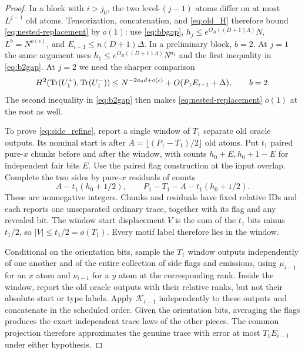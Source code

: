 \begin{proof}
In a block with $i>j_0$, the two level-$(j-1)$ atoms differ on at most $L^{j-1}$ old atoms.  Tensorization, concatenation, and \eqref{eq:old_H} therefore bound \eqref{eq:nested-replacement} by $o(1)$: use \eqref{eq:bbgap}, $h_j\le e^{O_B((D+1)\Lambda)}N$, $L^b=N^{o(\epsilon)}$, and $E_{i-1}\le n(D+1)\Delta$.  In a preliminary block, $b=2$.  At $j=1$ the same argument uses $h_1\le e^{O_B((D+1)\Lambda)}N^{a_1}$ and the first inequality in \eqref{eq:b2gap}.  At $j=2$ we need the sharper comparison
\begin{equation}\label{eq:side_refine}
 H^2(\mathrm{Tr}(U_1^+),\mathrm{Tr}(U_1^-))
 \le N^{-2a_0d+o(\epsilon)}+O(P_1E_{i-1}+\Delta),\qquad b=2.
\end{equation}
The second inequality in \eqref{eq:b2gap} then makes \eqref{eq:nested-replacement} $o(1)$ at the root as well.

To prove \eqref{eq:side_refine}, report a single window of $T_1$ separate old oracle outputs.  Its nominal start is after
$A=\lfloor(P_1-T_1)/2\rfloor$ old atoms.  Put $t_1$ paired pure-$x$ chunks before and after the window, with counts $h_0+E,h_0+1-E$ for independent fair bits $E$.  Use the paired flag construction at the input overlap.  Complete the two sides by pure-$x$ residuals of counts
\[
 A-t_1(h_0+1/2),\qquad P_1-T_1-A-t_1(h_0+1/2).
\]
These are nonnegative integers.  Chunks and residuals have fixed relative IDs and each reports one unseparated ordinary trace, together with its flag and any revealed bit.  The window start displacement $V$ is the sum of the $t_1$ bits minus $t_1/2$, so $|V|\le t_1/2=o(T_1)$.  Every motif label therefore lies in the window.

Conditional on the orientation bits, sample the $T_1$ window outputs independently of one another and of the entire collection of side flags and emissions, using $\mu_{i-1}$ for an $x$ atom and $\nu_{i-1}$ for a $y$ atom at the corresponding rank.  Inside the window, report the old oracle outputs with their relative ranks, but not their absolute start or type labels.  Apply $\mathcal K_{i-1}$ independently to these outputs and concatenate in the scheduled order.  Given the orientation bits, averaging the flags produces the exact independent trace laws of the other pieces.  The common projection therefore approximates the genuine trace with error at most $T_1E_{i-1}$ under either hypothesis.


\end{proof}
